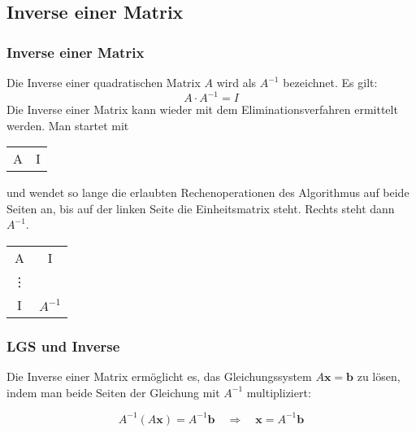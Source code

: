 \documentclass{beamer}
\begin{document}
\subsection{Inverse einer Matrix}
\begin{frame}
  \frametitle{Inverse einer Matrix}
  
  Die Inverse einer quadratischen Matrix $A$ wird als $A^{-1}$ bezeichnet. Es gilt:
  $$ A \cdot A^{-1} = I$$
  \vspace{0.3cm}
  Die Inverse einer Matrix kann wieder mit dem Eliminationsverfahren ermittelt werden. Man startet mit
  \begin{center}
    \begin{tabular}{c|c}
      A & I\\      
    \end{tabular}
  \end{center}
  und wendet so lange die erlaubten Rechenoperationen des Algorithmus auf beide Seiten an, bis auf der linken Seite die Einheitsmatrix steht. 
  Rechts steht dann $A^{-1}$.
  \begin{center}
    \begin{tabular}{c|c}
      A & I\\ 
      \vdots \\
      I & $A^{-1}$
    \end{tabular}
  \end{center}

\end{frame}


\begin{frame}
  \frametitle{LGS und Inverse}
  Die Inverse einer Matrix ermöglicht es, das Gleichungssystem $A \mathbf{x} = \mathbf{b}$ zu lösen, indem man beide Seiten der Gleichung mit $A^{-1}$ multipliziert:
  
  \[
  A^{-1} (A \mathbf{x}) = A^{-1} \mathbf{b} \quad \Rightarrow \quad \mathbf{x} = A^{-1} \mathbf{b}
  \]
\end{frame}
\end{document}
